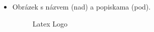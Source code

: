 \begin{itemize}
    \item Obrázek s názvem (nad) a popiskama (pod).
    \begin{figure}[ht]
        \centering
        \caption{Latex Logo}
        \par\medskip
        \label{fig:obrazek3}
    \end{figure}
\end{itemize}